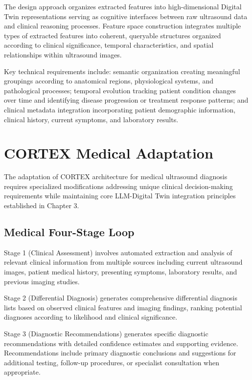 The design approach organizes extracted features into high-dimensional Digital Twin representations serving as cognitive interfaces between raw ultrasound data and clinical reasoning processes. Feature space construction integrates multiple types of extracted features into coherent, queryable structures organized according to clinical significance, temporal characteristics, and spatial relationships within ultrasound images.

Key technical requirements include: semantic organization creating meaningful groupings according to anatomical regions, physiological systems, and pathological processes; temporal evolution tracking patient condition changes over time and identifying disease progression or treatment response patterns; and clinical metadata integration incorporating patient demographic information, clinical history, current symptoms, and laboratory results.

\section{CORTEX Medical Adaptation}

The adaptation of CORTEX architecture for medical ultrasound diagnosis requires specialized modifications addressing unique clinical decision-making requirements while maintaining core LLM-Digital Twin integration principles established in Chapter 3.

\subsection{Medical Four-Stage Loop}

Stage 1 (Clinical Assessment) involves automated extraction and analysis of relevant clinical information from multiple sources including current ultrasound images, patient medical history, presenting symptoms, laboratory results, and previous imaging studies.

Stage 2 (Differential Diagnosis) generates comprehensive differential diagnosis lists based on observed clinical features and imaging findings, ranking potential diagnoses according to likelihood and clinical significance.

Stage 3 (Diagnostic Recommendations) generates specific diagnostic recommendations with detailed confidence estimates and supporting evidence. Recommendations include primary diagnostic conclusions and suggestions for additional testing, follow-up procedures, or specialist consultation when appropriate.

